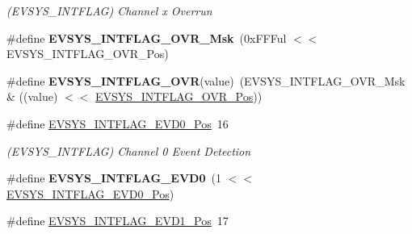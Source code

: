 \begin{DoxyCompactItemize}
\begin{DoxyCompactList}\small\item\em (E\+V\+S\+Y\+S\+\_\+\+I\+N\+T\+F\+L\+A\+G) Channel x Overrun \end{DoxyCompactList}\item 
\hypertarget{group___s_a_m_l21___e_v_s_y_s_ga43cc56ec4337aadbae27fb0b27af7c28}{}\#define {\bfseries E\+V\+S\+Y\+S\+\_\+\+I\+N\+T\+F\+L\+A\+G\+\_\+\+O\+V\+R\+\_\+\+Msk}~(0x\+F\+F\+Ful $<$$<$ E\+V\+S\+Y\+S\+\_\+\+I\+N\+T\+F\+L\+A\+G\+\_\+\+O\+V\+R\+\_\+\+Pos)\label{group___s_a_m_l21___e_v_s_y_s_ga43cc56ec4337aadbae27fb0b27af7c28}

\item 
\hypertarget{group___s_a_m_l21___e_v_s_y_s_ga6b5673b5cc82c6c4acf5e000330e8860}{}\#define {\bfseries E\+V\+S\+Y\+S\+\_\+\+I\+N\+T\+F\+L\+A\+G\+\_\+\+O\+V\+R}(value)~(E\+V\+S\+Y\+S\+\_\+\+I\+N\+T\+F\+L\+A\+G\+\_\+\+O\+V\+R\+\_\+\+Msk \& ((value) $<$$<$ \hyperlink{group___s_a_m_l21___e_v_s_y_s_ga330504a44a29458d9dd09c5ee73ba6d5}{E\+V\+S\+Y\+S\+\_\+\+I\+N\+T\+F\+L\+A\+G\+\_\+\+O\+V\+R\+\_\+\+Pos}))\label{group___s_a_m_l21___e_v_s_y_s_ga6b5673b5cc82c6c4acf5e000330e8860}

\item 
\hypertarget{group___s_a_m_l21___e_v_s_y_s_ga5ba2bc5e488e7679e076988520eeaf7f}{}\#define \hyperlink{group___s_a_m_l21___e_v_s_y_s_ga5ba2bc5e488e7679e076988520eeaf7f}{E\+V\+S\+Y\+S\+\_\+\+I\+N\+T\+F\+L\+A\+G\+\_\+\+E\+V\+D0\+\_\+\+Pos}~16\label{group___s_a_m_l21___e_v_s_y_s_ga5ba2bc5e488e7679e076988520eeaf7f}

\begin{DoxyCompactList}\small\item\em (E\+V\+S\+Y\+S\+\_\+\+I\+N\+T\+F\+L\+A\+G) Channel 0 Event Detection \end{DoxyCompactList}\item 
\hypertarget{group___s_a_m_l21___e_v_s_y_s_gacde3836bcd52db578be66afd8084afbe}{}\#define {\bfseries E\+V\+S\+Y\+S\+\_\+\+I\+N\+T\+F\+L\+A\+G\+\_\+\+E\+V\+D0}~(1 $<$$<$ \hyperlink{group___s_a_m_l21___e_v_s_y_s_ga5ba2bc5e488e7679e076988520eeaf7f}{E\+V\+S\+Y\+S\+\_\+\+I\+N\+T\+F\+L\+A\+G\+\_\+\+E\+V\+D0\+\_\+\+Pos})\label{group___s_a_m_l21___e_v_s_y_s_gacde3836bcd52db578be66afd8084afbe}

\item 
\hypertarget{group___s_a_m_l21___e_v_s_y_s_ga6ccad0fbd29790dec58a8fceb626e960}{}\#define \hyperlink{group___s_a_m_l21___e_v_s_y_s_ga6ccad0fbd29790dec58a8fceb626e960}{E\+V\+S\+Y\+S\+\_\+\+I\+N\+T\+F\+L\+A\+G\+\_\+\+E\+V\+D1\+\_\+\+Pos}~17\label{group___s_a_m_l21___e_v_s_y_s_ga6ccad0fbd29790dec58a8fceb626e960}


\end{DoxyCompactItemize}
